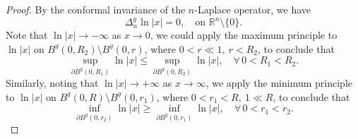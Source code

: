 \documentclass[12pt]{amsart}
\theoremstyle{plain}
\theoremstyle{definition}
\theoremstyle{remark}     %
\numberwithin{equation}{section}
\begin{document}
\begin{proof}
    By the conformal invariance of the $n$-Laplace operator, we have
    \[
        \Delta_n^g\ln |x|=0,\quad \text{on } \mathbb{R}^n\setminus\{0\}.
    \]
    Note that $\ln |x|\to-\infty$ as $x\to 0$, we could apply the maximum principle to $\ln |x|$ on $B^g(0,R_2)\setminus B^g(0,r)$, where $0<r\ll1,\ r<R_2$, to conclude that
    \[
        \sup_{\partial B^g(0,R_1)}\ln |x|
        \leq  \sup_{\partial B^g(0,R_2)}\ln |x|,\quad \forall \,0<R_1<R_2.
    \]
 Similarly, noting that $\ln |x|\to +\infty$ as $x\to \infty$, we apply the minimum principle to $\ln |x|$ on $B^g(0,R)\setminus B^g(0,r_1)$, where $0<r_1<R,\ 1\ll R$, to conclude that
    \[
        \inf_{\partial B^g(0,r_2)}\ln |x|
        \geq  \inf_{\partial B^g(0,r_1)}\ln |x|,\quad \forall \,0<r_1<r_2.
    \]
\end{proof}
\end{document}
